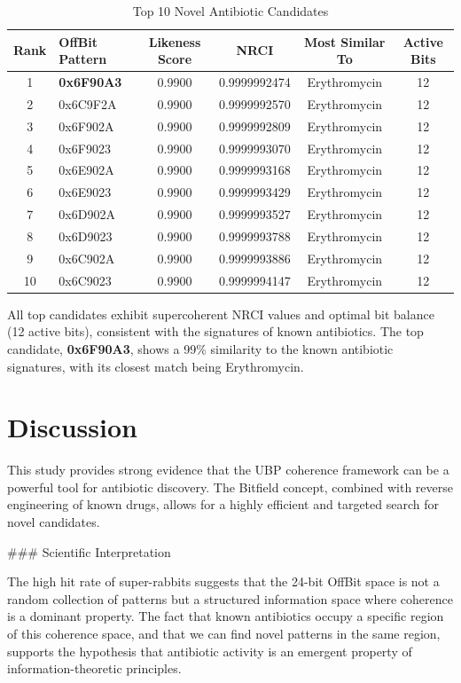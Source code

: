 \documentclass[12pt, a4paper]{article}
\begin{document}
\begin{table}[h!]
\centering
\caption{Top 10 Novel Antibiotic Candidates}
\label{tab:top_candidates}
\begin{tabular}{@{}clcccc@{}}
\toprule
\textbf{Rank} & \textbf{OffBit Pattern} & \textbf{Likeness Score} & \textbf{NRCI} & \textbf{Most Similar To} & \textbf{Active Bits} \\
\midrule
1 & \textbf{0x6F90A3} & 0.9900 & 0.9999992474 & Erythromycin & 12 \\
2 & 0x6C9F2A & 0.9900 & 0.9999992570 & Erythromycin & 12 \\
3 & 0x6F902A & 0.9900 & 0.9999992809 & Erythromycin & 12 \\
4 & 0x6F9023 & 0.9900 & 0.9999993070 & Erythromycin & 12 \\
5 & 0x6E902A & 0.9900 & 0.9999993168 & Erythromycin & 12 \\
6 & 0x6E9023 & 0.9900 & 0.9999993429 & Erythromycin & 12 \\
7 & 0x6D902A & 0.9900 & 0.9999993527 & Erythromycin & 12 \\
8 & 0x6D9023 & 0.9900 & 0.9999993788 & Erythromycin & 12 \\
9 & 0x6C902A & 0.9900 & 0.9999993886 & Erythromycin & 12 \\
10 & 0x6C9023 & 0.9900 & 0.9999994147 & Erythromycin & 12 \\
\bottomrule
\end{tabular}
\end{table}

All top candidates exhibit supercoherent NRCI values and optimal bit balance (12 active bits), consistent with the signatures of known antibiotics. The top candidate, \textbf{0x6F90A3}, shows a 99\% similarity to the known antibiotic signatures, with its closest match being Erythromycin.

\section{Discussion}

This study provides strong evidence that the UBP coherence framework can be a powerful tool for antibiotic discovery. The Bitfield concept, combined with reverse engineering of known drugs, allows for a highly efficient and targeted search for novel candidates.

### Scientific Interpretation

The high hit rate of super-rabbits suggests that the 24-bit OffBit space is not a random collection of patterns but a structured information space where coherence is a dominant property. The fact that known antibiotics occupy a specific region of this coherence space, and that we can find novel patterns in the same region, supports the hypothesis that antibiotic activity is an emergent property of information-theoretic principles.
\end{document}
